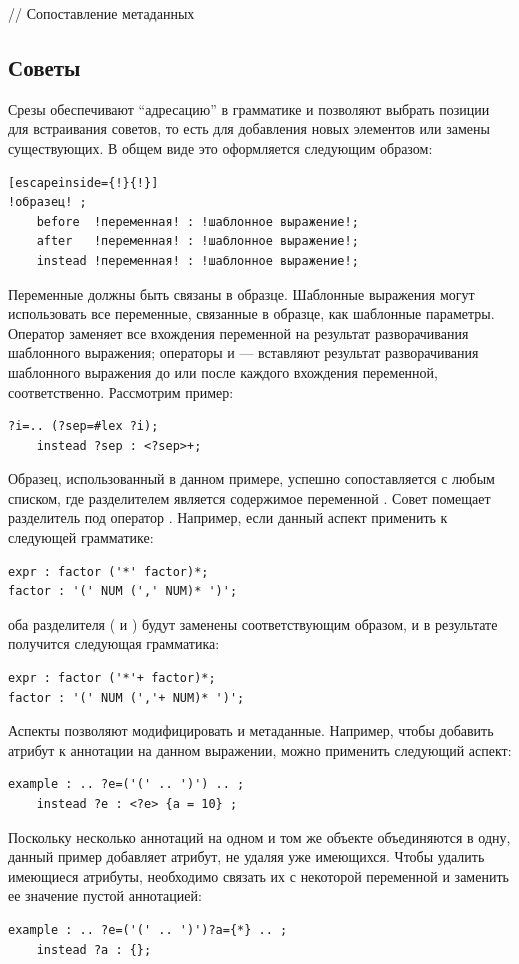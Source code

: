 // Сопоставление метаданных

\subsection{Советы}

Срезы обеспечивают ``адресацию'' в грамматике и позволяют выбрать позиции для встраивания советов, то есть для добавления новых элементов или замены существующих. В общем виде это оформляется следующим образом:
\begin{lstlisting}[escapeinside={!}{!}]
!образец! ;
	before  !переменная! : !шаблонное выражение!;
	after   !переменная! : !шаблонное выражение!;
	instead !переменная! : !шаблонное выражение!;
\end{lstlisting}
Переменные должны быть связаны в образце. Шаблонные выражения могут использовать все переменные, связанные в образце, как шаблонные параметры. Оператор  заменяет все вхождения переменной на результат разворачивания шаблонного выражения; операторы  и  --- вставляют результат разворачивания шаблонного выражения до или после каждого вхождения переменной, соответственно. Рассмотрим пример:
\begin{lstlisting}
?i=.. (?sep=#lex ?i);
	instead ?sep : <?sep>+;
\end{lstlisting}
Образец, использованный в данном примере, успешно сопоставляется с любым списком, где разделителем является содержимое переменной . Совет  помещает разделитель под оператор \code{+}. Например, если данный аспект применить к следующей грамматике:
\begin{lstlisting}
expr : factor ('*' factor)*;
factor : '(' NUM (',' NUM)* ')';
\end{lstlisting}
оба разделителя (\code{*} и \code{,}) будут заменены соответствующим образом, и в результате получится следующая грамматика:
\begin{lstlisting}
expr : factor ('*'+ factor)*;
factor : '(' NUM (','+ NUM)* ')';
\end{lstlisting}

Аспекты позволяют модифицировать и метаданные. Например, чтобы добавить атрибут к аннотации на данном выражении, можно применить следующий аспект:
\begin{lstlisting}
example : .. ?e=('(' .. ')') .. ;
	instead ?e : <?e> {a = 10} ;
\end{lstlisting}
Поскольку несколько аннотаций на одном и том же объекте объединяются в одну, данный пример добавляет атрибут, не удаляя уже имеющихся. Чтобы удалить имеющиеся атрибуты, необходимо связать их с некоторой переменной и заменить ее значение пустой аннотацией:
\begin{lstlisting}
example : .. ?e=('(' .. ')')?a={*} .. ;
	instead ?a : {};
\end{lstlisting}

